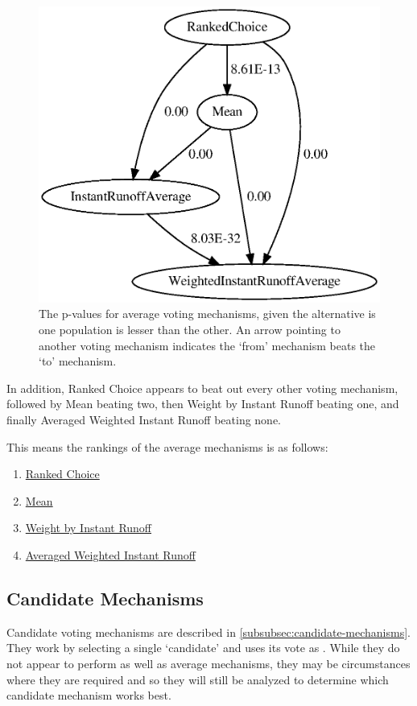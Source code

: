 \begin{figure}[htbp]
    \centering
    \includegraphics[scale=0.75]
    {./content/figures/average-mechanisms-p-values.gv}
    \caption{The p-values for average voting mechanisms, given the alternative is one
    population is lesser than the other.
    An arrow pointing to another voting mechanism indicates the `from' mechanism
    beats the `to' mechanism.}
    \label{fig:average-mechanisms-p-values}
\end{figure}

In addition, Ranked Choice appears to beat out every other voting mechanism, followed
by Mean beating two, then Weight by Instant Runoff beating one, and finally Averaged
Weighted Instant Runoff beating none.
\begin{samepage}
    This means the rankings of the average mechanisms is as follows:
    \begin{enumerate}
        \item \hyperref[para:avg-ranked-choice]{Ranked Choice}
        \item \hyperref[para:mean]{Mean}
        \item \hyperref[para:avg-instant-runoff]{Weight by Instant Runoff}
        \item \hyperref[para:avg-weighted-instant-runoff]{Averaged Weighted Instant
        Runoff}
    \end{enumerate}
\end{samepage}

\subsection{Candidate Mechanisms}\label{subsec:lowest-error-candidate-mechanisms}
Candidate voting mechanisms are described in \autoref{subsubsec:candidate-mechanisms}.
They work by selecting a single `candidate' and uses its vote as \systemtruth.
While they do not appear to perform as well as average mechanisms, they may be
circumstances where they are required and so they will still be analyzed to determine
which candidate mechanism works best.

